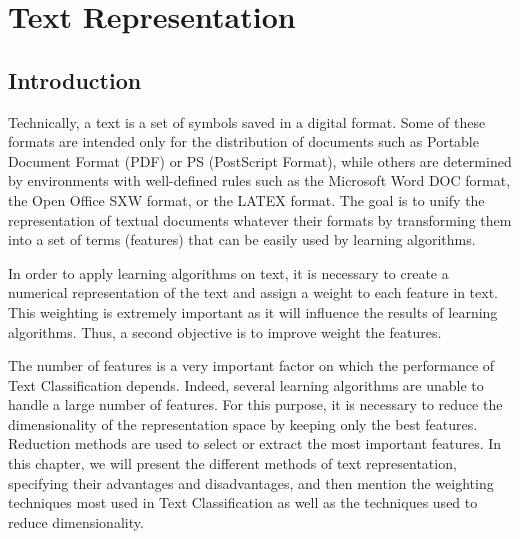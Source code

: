 
\chapter{Text Representation} %

\label{Chapter1} %


\section{Introduction} 

Technically, a text is a set of symbols saved in a digital format. Some
of these formats are intended only for the distribution of documents
such as Portable Document Format (PDF) or PS (PostScript Format), while
others are determined by environments with well-defined rules such as
the Microsoft Word DOC format, the Open Office SXW format, or the LATEX
format. The goal is to unify the representation of textual documents
whatever their formats by transforming them into a set of terms
(features) that can be easily used by learning algorithms.

In order to apply learning algorithms on text, it is necessary to create
a numerical representation of the text and assign a weight to each
feature in text. This weighting is extremely important as it will
influence the results of learning algorithms. Thus, a second objective
is to improve weight the features.

The number of features is a very important factor on which the
performance of Text Classification depends. Indeed, several learning
algorithms are unable to handle a large number of features. For this
purpose, it is necessary to reduce the dimensionality of the
representation space by keeping only the best features. Reduction
methods are used to select or extract the most important features. In
this chapter, we will present the different methods of text
representation, specifying their advantages and disadvantages, and then
mention the weighting techniques most used in Text Classification as
well as the techniques used to reduce dimensionality.

